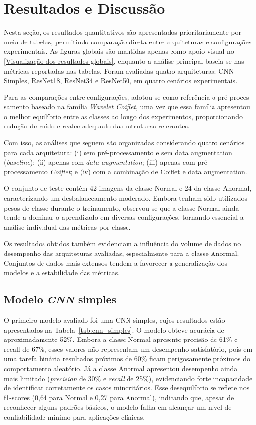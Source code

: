 \chapter{Resultados e Discussão}\label{resultados}

Nesta seção, os resultados quantitativos são apresentados prioritariamente por meio de tabelas, permitindo comparação direta entre arquiteturas e configurações experimentais. As figuras globais são mantidas apenas como apoio visual no \autoref{Visualização dos resultados globais}, enquanto a análise principal baseia-se nas métricas reportadas nas tabelas. Foram avaliadas quatro arquiteturas: CNN Simples, ResNet18, ResNet34 e ResNet50, em quatro cenários experimentais.

Para as comparações entre configurações, adotou-se como referência o pré-proces- \newline samento baseado na família \textit{Wavelet Coiflet}, uma vez que essa família apresentou o melhor equilíbrio entre as classes ao longo dos experimentos, proporcionando redução de ruído e realce adequado das estruturas relevantes.

Com isso, as análises que seguem são organizadas considerando quatro cenários para cada arquitetura: (i) sem pré-processamento e sem data augmentation (\textit{baseline}); (ii) apenas com \textit{data augmentation}; (iii) apenas com pré-processamento \textit{Coiflet}; e (iv) com a combinação de Coiflet e data augmentation.

O conjunto de teste contém 42 imagens da classe Normal e 24 da classe Anormal, caracterizando um desbalanceamento moderado. Embora tenham sido utilizados pesos de classe durante o treinamento, observou-se que a classe Normal ainda tende a dominar o aprendizado em diversas configurações, tornando essencial a análise individual das métricas por classe.

Os resultados obtidos também evidenciam a influência do volume de dados no desempenho das arquiteturas avaliadas, especialmente para a classe Anormal. Conjuntos de dados mais extensos tendem a favorecer a generalização dos modelos e a estabilidade das métricas.
\section*{Modelo \textit{CNN} simples}

O primeiro modelo avaliado foi uma CNN simples, cujos resultados estão apresentados na Tabela~\ref{tab:cnn_simples}. O modelo obteve acurácia de aproximadamente 52\%. Embora a classe Normal apresente precisão de 61\% e recall de 67\%, esses valores não representam um desempenho satisfatório, pois em uma tarefa binária resultados próximos de 60\% ficam perigosamente próximos do comportamento aleatório. Já a classe Anormal apresentou desempenho ainda mais limitado (\textit{precision} de 30\% e \textit{recall} de 25\%), evidenciando forte incapacidade de identificar corretamente os casos minoritários. Esse desequilíbrio se reflete nos f1-scores (0{,}64 para Normal e 0{,}27 para Anormal), indicando que, apesar de reconhecer alguns padrões básicos, o modelo falha em alcançar um nível de confiabilidade mínimo para aplicações clínicas.

